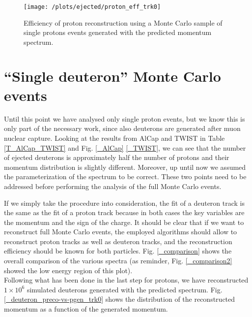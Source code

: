 \documentclass[12pt,a4paper,openright, oneside, titlepage]{book} %
\begin{document}
\begin{figure}[!htb]
\centering
\texttt{[image: /plots/ejected/proton\_eff\_trk0]}
\caption[Efficiency of proton reconstruction]{Efficiency of proton reconstruction using a Monte Carlo sample of single protons events 
generated with the predicted momentum spectrum.}
\label{_proton_eff_trk0}
\end{figure}

\section{``Single deuteron'' Monte Carlo events}
Until this point we have analysed only single proton events, 
but we know this is only part of the necessary work, 
since also deuterons are generated after muon nuclear capture.
Looking at the results from AlCap and TWIST in Table \ref{T_AlCap_TWIST} and Fig. \ref{_AlCap} \ref{_TWIST}, we can see that the number of ejected deuterons is approximately half the number of protons and their momentum distribution is slightly different.
Moreover, up until now we assumed the parameterization of the spectrum to be correct. 
These two points need to be addressed before performing the analysis of the full Monte Carlo events.

\noindent
If we simply take the procedure into consideration, 
the fit of a deuteron track is the same as the fit of a proton track because 
in both cases the key variables are the momentum and the sign of the charge.
It should be clear that if we want to reconstruct full Monte Carlo events,
the employed algorithms should allow to reconstruct proton tracks as well as deuteron tracks,
and the reconstruction efficiency should be known for both particles.
Fig. \ref{_comparison} shows the overall comparison of the various spectra 
(as reminder, Fig. \ref{_comparison2} showed the low energy region of this plot).\\
Following what has been done in the last step for protons, 
we have reconstructed $1 \times 10^6$ simulated deuterons generated with the predicted spectrum. 
Fig. \ref{_deuteron_preco-vs-pgen_trk0} shows the distribution of the reconstructed momentum 
as a function of the generated momentum. 
\end{document}
